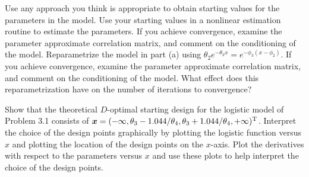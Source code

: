 \begin{problems}
  \subprob Use any approach you think is appropriate to obtain
    starting values for the parameters in the model.
  \subprob Use your starting values in a nonlinear estimation
    routine to estimate the parameters.
    If you achieve convergence, examine the parameter
    approximate correlation matrix, and comment on the
    conditioning of the model.
  \subprob Reparametrize the model in part (a) using $\theta_2
    e^{ - \theta_3 x }= e^{ - \phi_3 ( x - \phi_2 ) }$.
    If you achieve convergence, examine the parameter
    approximate correlation matrix, and comment on the
    conditioning of the model.
    What effect does this reparametrization have on the
    number of iterations to convergence?

\prob 

  \subprob Show that the theoretical $D$-optimal starting
    design for the logistic model of Problem 3.1
    consists of $\bx=(-\infty,\theta_3-1.044/
    \theta_4,\theta_3+1.044/ \theta_4,+\infty)\trans$. 
  \subprob Interpret the choice of the design points
    graphically by plotting the logistic function versus
    $x$ and plotting the location of the design points
    on the $x$-axis.
  \subprob Plot the derivatives with respect to the parameters
    versus $x$ and use these plots to help interpret the
    choice of the design points.

\end{problems}

